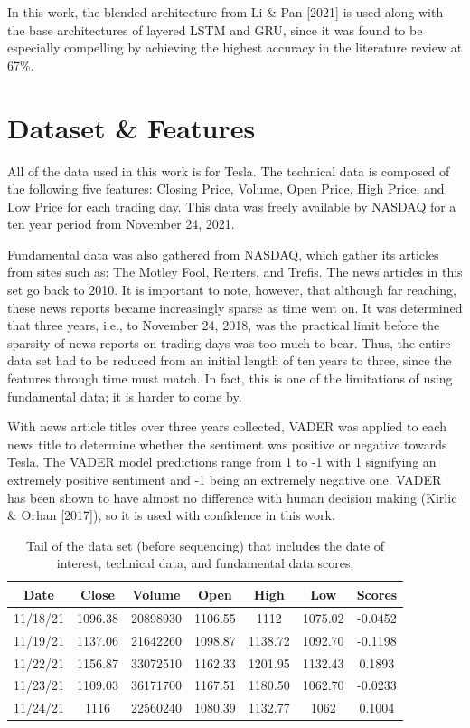 \documentclass{article}
\begin{document}
In this work, the blended architecture from Li \& Pan [2021] is used along with the base
architectures of layered LSTM and GRU, since it was found to be especially
compelling by achieving the highest accuracy in the literature review at 67\%.

\section{Dataset \& Features}

All of the data used in this work is for Tesla. The technical data is composed
of the following five features: Closing Price, Volume, Open Price, High Price,
and Low Price for each trading day. This data was freely available by NASDAQ
for a ten year period from November 24, 2021.

Fundamental data was also gathered from NASDAQ, which 
gather its articles from sites such as: The Motley Fool, Reuters, and Trefis. 
The news articles in this set
go back to 2010. It is important to note, however, that although far reaching,
these news reports became increasingly sparse as time went on. It was determined
that three years, i.e., to November 24, 2018, was the practical limit before the
sparsity of news reports on trading days was too much to bear. Thus, the entire
data set had to be reduced from an initial length of ten years to three,
since the features through time must match. In fact, this is one of the
limitations of using fundamental data; it is harder to come by.

With news article titles over three years collected, VADER was applied to each news
title to determine whether the sentiment was positive or negative
towards Tesla. The VADER model predictions range from 1 to -1 with 1 signifying
an extremely positive sentiment and -1 being an extremely negative one. VADER
has been shown to have almost no difference with human decision making (Kirlic
\& Orhan [2017]), so it is used with confidence in this work.

\begin{table}
	\centering
	\caption{Tail of the data set (before sequencing) that includes the date of
	interest, technical data, and fundamental data scores.}
	\begin{tabular}{c c c c c c c}
		\toprule
		Date & Close & Volume & Open & High & Low & Scores\\
		\midrule
		11/18/21 & 1096.38 & 20898930 & 1106.55 & 1112 & 1075.02 & -0.0452\\
		11/19/21 & 1137.06 & 21642260 & 1098.87 & 1138.72 & 1092.70 & -0.1198\\
		11/22/21 & 1156.87 & 33072510 & 1162.33 & 1201.95 & 1132.43 & 0.1893\\
		11/23/21 & 1109.03 & 36171700 & 1167.51 & 1180.50 & 1062.70 & -0.0233\\
		11/24/21 & 1116 & 22560240 & 1080.39 & 1132.77 & 1062 & 0.1004\\
		\bottomrule
	\end{tabular}
	\label{tbl:dataset}
\end{table}
\end{document}
